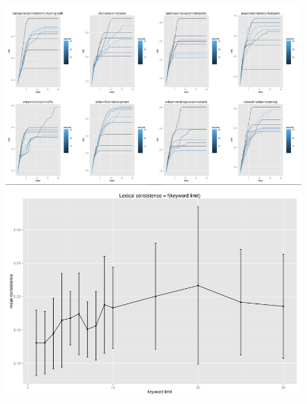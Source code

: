 \begin{figure}
\includegraphics[width=\linewidth,height=0.85\textheight]{Figures/Final/A-quantepistemo-sensitivity-algosr.jpg}

\end{figure}
